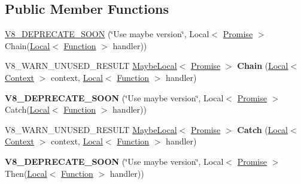 \subsection*{Public Member Functions}
\begin{DoxyCompactItemize}
\item 
\hyperlink{classv8_1_1Promise_ac9e25a14d830bd505ee1eb129d374202}{V8\+\_\+\+D\+E\+P\+R\+E\+C\+A\+T\+E\+\_\+\+S\+O\+O\+N} (\char`\"{}Use maybe version\char`\"{}, Local$<$ \hyperlink{classv8_1_1Promise}{Promise} $>$ Chain(\hyperlink{classv8_1_1Local}{Local}$<$ \hyperlink{classv8_1_1Function}{Function} $>$ handler))
\item 
\hypertarget{classv8_1_1Promise_aa5b3073ef8088aaee5fc552579a20c8e}{}V8\+\_\+\+W\+A\+R\+N\+\_\+\+U\+N\+U\+S\+E\+D\+\_\+\+R\+E\+S\+U\+L\+T \hyperlink{classv8_1_1MaybeLocal}{Maybe\+Local}$<$ \hyperlink{classv8_1_1Promise}{Promise} $>$ {\bfseries Chain} (\hyperlink{classv8_1_1Local}{Local}$<$ \hyperlink{classv8_1_1Context}{Context} $>$ context, \hyperlink{classv8_1_1Local}{Local}$<$ \hyperlink{classv8_1_1Function}{Function} $>$ handler)\label{classv8_1_1Promise_aa5b3073ef8088aaee5fc552579a20c8e}

\item 
\hypertarget{classv8_1_1Promise_afe587457d3dc97c0ffb99193a456cbd0}{}{\bfseries V8\+\_\+\+D\+E\+P\+R\+E\+C\+A\+T\+E\+\_\+\+S\+O\+O\+N} (\char`\"{}Use maybe version\char`\"{}, Local$<$ \hyperlink{classv8_1_1Promise}{Promise} $>$ Catch(\hyperlink{classv8_1_1Local}{Local}$<$ \hyperlink{classv8_1_1Function}{Function} $>$ handler))\label{classv8_1_1Promise_afe587457d3dc97c0ffb99193a456cbd0}

\item 
\hypertarget{classv8_1_1Promise_ab5b9bc0140b750cbf569f3a0e6c92b42}{}V8\+\_\+\+W\+A\+R\+N\+\_\+\+U\+N\+U\+S\+E\+D\+\_\+\+R\+E\+S\+U\+L\+T \hyperlink{classv8_1_1MaybeLocal}{Maybe\+Local}$<$ \hyperlink{classv8_1_1Promise}{Promise} $>$ {\bfseries Catch} (\hyperlink{classv8_1_1Local}{Local}$<$ \hyperlink{classv8_1_1Context}{Context} $>$ context, \hyperlink{classv8_1_1Local}{Local}$<$ \hyperlink{classv8_1_1Function}{Function} $>$ handler)\label{classv8_1_1Promise_ab5b9bc0140b750cbf569f3a0e6c92b42}

\item 
\hypertarget{classv8_1_1Promise_aa6e2d28233609852640691276848591d}{}{\bfseries V8\+\_\+\+D\+E\+P\+R\+E\+C\+A\+T\+E\+\_\+\+S\+O\+O\+N} (\char`\"{}Use maybe version\char`\"{}, Local$<$ \hyperlink{classv8_1_1Promise}{Promise} $>$ Then(\hyperlink{classv8_1_1Local}{Local}$<$ \hyperlink{classv8_1_1Function}{Function} $>$ handler))\label{classv8_1_1Promise_aa6e2d28233609852640691276848591d}


\end{DoxyCompactItemize}
